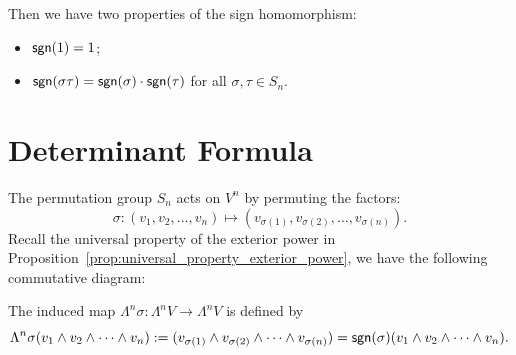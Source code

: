Then we have two properties of the sign homomorphism:
\begin{itemize}
  \item $\operatorname{\text{\normalfont\sffamily sgn}}(1) = 1$;
  \item $\operatorname{\text{\normalfont\sffamily sgn}}(\sigma \tau) = \operatorname{\text{\normalfont\sffamily sgn}}(\sigma) \cdot \operatorname{\text{\normalfont\sffamily sgn}}(\tau)$ for all $\sigma, \tau \in S_n$.
\end{itemize}

\section{Determinant Formula}

The permutation group $S_n$ acts on $V^n$ by permuting the factors:
\[
  \sigma \colon (v_1, v_2, \ldots, v_n) \mapsto (v_{\sigma(1)}, v_{\sigma(2)}, \ldots, v_{\sigma(n)}).
\]
Recall the universal property of the exterior power in Proposition~\ref{prop:universal_property_exterior_power}, we have the following commutative diagram:
\begin{center}
\end{center}
The induced map $\Lambda^n \sigma \colon \Lambda^n V \to \Lambda^n V$ is defined by
\[
  \Lambda^n \sigma (v_1 \wedge v_2 \wedge \cdots \wedge v_n) := (v_{\sigma(1)} \wedge v_{\sigma(2)} \wedge \cdots \wedge v_{\sigma(n)}) = \operatorname{\text{\normalfont\sffamily sgn}}(\sigma) (v_1 \wedge v_2 \wedge \cdots \wedge v_n).
\]

